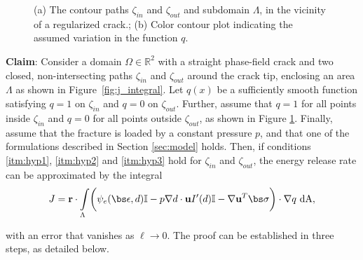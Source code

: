 \begin{figure}[ht]
\begin{subfigure}{.49\textwidth}
  \caption{}
  \label{fig:j_integral_q}
\end{subfigure}%
  \caption{(a) The contour paths $\zeta_{in}$ and $\zeta_{out}$ and subdomain $\Lambda$, in the vicinity of a regularized crack.; (b) Color contour plot indicating the assumed variation in the function $q$.  } 
  \label{fig:j_integral_pics}
\end{figure}


\medskip

\noindent\textbf{Claim}: Consider a domain $\Omega \in \mathbb{R}^2$ with a straight phase-field crack and two closed, non-intersecting paths $\zeta_{in}$ and $\zeta_{out}$ around the crack tip, enclosing an area $\Lambda$ as shown in Figure~\ref{fig:j_integral}. Let $q(x)$ be a sufficiently smooth function satisfying $q = 1$ on $\zeta_{in}$ and $q = 0$ on $\zeta_{out}$. Further, assume that $q = 1$ for all points inside $\zeta_{in}$ and $q = 0$ for all points outside $\zeta_{out}$, as shown in Figure \ref{fig:j_integral_q}. Finally, assume that the fracture is loaded by a constant pressure $p$, and that one of the formulations described in Section \ref{sec:model} holds. Then, if conditions \ref{itm:hyp1}, \ref{itm:hyp2} and \ref{itm:hyp3} hold for $\zeta_{in}$ and $\zeta_{out}$, the energy release rate can be approximated by the  integral
\begin{equation}\label{j_integral_theorem}
    J = \textbf{r} \cdot \int\limits_{\Lambda} \biggl( \psi_e(\bs\epsilon, d)\mathbb{I} -p\nabla d\cdot\textbf{u}I'(d)\mathbb{I}  - \nabla \textbf{u}^T\bs \sigma \biggr) \cdot \nabla q\ \text{dA},
\end{equation}

\noindent with an error that vanishes as $\ell \rightarrow 0$. The proof can be established in three steps, as detailed below.

